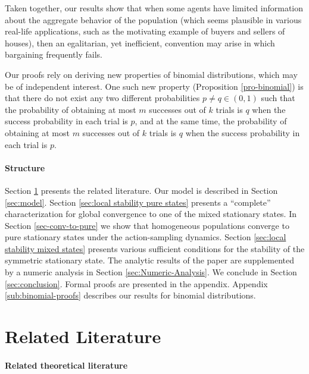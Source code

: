 \documentclass[12pt]{article}
\numberwithin{equation}{section}
\numberwithin{figure}{section}
\theoremstyle{definition}
\theoremstyle{plain}
\theoremstyle{plain}
\theoremstyle{plain}
\theoremstyle{remark}
\theoremstyle{plain}
\theoremstyle{plain}
\begin{document}
Taken together, our results show that when 
some agents have limited information about the aggregate behavior of the population (which seems plausible in various real-life applications, such as the motivating example of buyers and sellers of houses), then an egalitarian, yet inefficient, convention may arise in which bargaining frequently fails. 

 Our proofs rely on deriving new properties of binomial distributions, which may be of independent interest. One 
 such new property (Proposition \ref{pro-binomial}) is that  there do
not exist any two different probabilities $p\neq q\in(0,1)$ such that the probability of obtaining at most $m$ successes out of $k$ trials is $q$ when the success probability in each trial is $p$, and at the same time, the probability of obtaining at most $m$ successes out of $k$ trials is $q$ when the success probability in each trial is $p$.

\paragraph{Structure} 
Section \ref{related-literature} presents the related literature. Our model is described in Section \ref{sec:model}. Section \ref{sec:local stability pure states} presents a ``complete'' characterization for global convergence to one of the mixed stationary states. In Section \ref{sec-conv-to-pure} we show that homogeneous populations converge to pure stationary states under the action-sampling dynamics.  Section \ref{sec:local stability mixed states} presents various sufficient conditions for the  stability of the  symmetric stationary state.
The analytic results of the paper are supplemented by a numeric analysis in Section \ref{sec:Numeric-Analysis}.
We conclude in Section \ref{sec:conclusion}. Formal proofs are presented in the appendix. 
Appendix \ref{sub:binomial-proofs} describes our results for binomial distributions.

\section{Related Literature}\label{related-literature}
\paragraph{Related theoretical literature}
\end{document}
